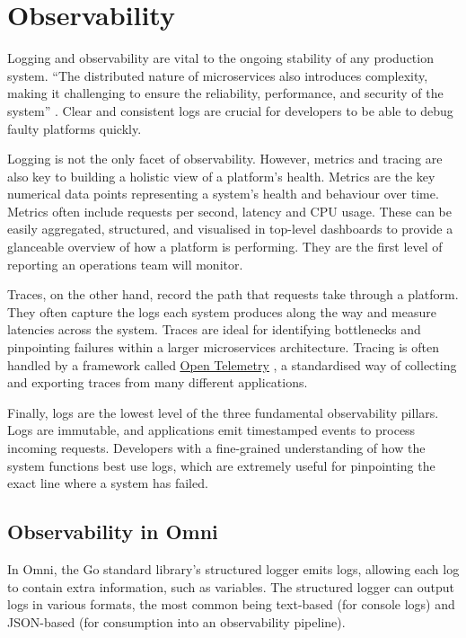 \section{Observability}
Logging and observability are vital to the ongoing stability of any production system. ``The distributed nature of microservices also introduces complexity, making  it  challenging  to  ensure  the  reliability,  performance,  and  security  of  the  system'' \citep{chinamanagonda2022observability}.
Clear and consistent logs are crucial for developers to be able to debug faulty platforms quickly. 

Logging is not the only facet of observability. However, metrics and tracing are also key to building a holistic view of a platform's health.
Metrics are the key numerical data points representing a system's health and behaviour over time.
Metrics often include requests per second, latency and CPU usage. These can be easily aggregated, structured, and visualised in top-level dashboards to provide a glanceable overview of how a platform is performing.
They are the first level of reporting an operations team will monitor.

Traces, on the other hand, record the path that requests take through a platform. They often capture the logs each system produces along the way and measure latencies across the system.
Traces are ideal for identifying bottlenecks and pinpointing failures within a larger microservices architecture. Tracing is often handled by a framework called \underline{\href{https://opentelemetry.io}{Open Telemetry}} \nocite{opentel}, a standardised way of collecting and exporting traces from many different applications.

Finally, logs are the lowest level of the three fundamental observability pillars. Logs are immutable, and applications emit timestamped events to process incoming requests.
Developers with a fine-grained understanding of how the system functions best use logs, which are extremely useful for pinpointing the exact line where a system has failed. 

\subsection{Observability in Omni}
In Omni, the Go standard library's structured logger emits logs, allowing each log to contain extra information, such as variables.
The structured logger can output logs in various formats, the most common being text-based (for console logs) and JSON-based (for consumption into an observability pipeline).

